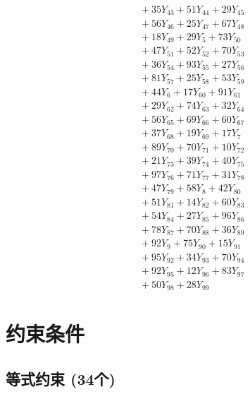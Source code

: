 \documentclass[a4paper,10pt]{article}
\begin{document}
{\begin{align}
&\quad  + 35Y_{43} + 51Y_{44} + 29Y_{45} \\[0.5ex]
&\quad  + 56Y_{46} + 25Y_{47} + 67Y_{48} \\[0.5ex]
&\quad  + 18Y_{49} + 29Y_{5} + 73Y_{50} \\[0.5ex]
&\quad  + 47Y_{51} + 52Y_{52} + 70Y_{53} \\[0.5ex]
&\quad  + 36Y_{54} + 93Y_{55} + 27Y_{56} \\[0.5ex]
&\quad  + 81Y_{57} + 25Y_{58} + 53Y_{59} \\[0.5ex]
&\quad  + 44Y_{6} + 17Y_{60} + 91Y_{61} \\[0.5ex]
&\quad  + 29Y_{62} + 74Y_{63} + 32Y_{64} \\[0.5ex]
&\quad  + 56Y_{65} + 69Y_{66} + 60Y_{67} \\[0.5ex]
&\quad  + 37Y_{68} + 19Y_{69} + 17Y_{7} \\[0.5ex]
&\quad  + 89Y_{70} + 70Y_{71} + 10Y_{72} \\[0.5ex]
&\quad  + 21Y_{73} + 39Y_{74} + 40Y_{75} \\[0.5ex]
&\quad  + 97Y_{76} + 71Y_{77} + 31Y_{78} \\[0.5ex]
&\quad  + 47Y_{79} + 58Y_{8} + 42Y_{80} \\[0.5ex]
&\quad  + 51Y_{81} + 14Y_{82} + 60Y_{83} \\[0.5ex]
&\quad  + 54Y_{84} + 27Y_{85} + 96Y_{86} \\[0.5ex]
&\quad  + 78Y_{87} + 70Y_{88} + 36Y_{89} \\[0.5ex]
&\quad  + 92Y_{9} + 75Y_{90} + 15Y_{91} \\[0.5ex]
&\quad  + 95Y_{92} + 34Y_{93} + 70Y_{94} \\[0.5ex]
&\quad  + 92Y_{95} + 12Y_{96} + 83Y_{97} \\[0.5ex]
&\quad  + 50Y_{98} + 28Y_{99}\nonumber
\end{align}
}

\section{约束条件}

\subsection{等式约束 (34个)}
\end{document}
